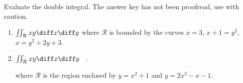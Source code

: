 Evaluate the double integral. The answer key has not been proofread, use with caution.

\begin{enumerate}
\item \label{problemintegralxydxdyoverx=3,x+1=y^2,x=y^2+2y+3} $\iint_{\mathcal R} xy \diff x\diff y$ where $\mathcal R$ is bounded by the curves $x=3 $, $x+1=y^2$, $x= y^2+2y+3$.

\item \label{problemintegralxydxdyovery=x^2+1,y=2x^2-x-1} 
$\iint_{\mathcal R} xy\diff x\diff y\quad .$

where $\mathcal R$ is the region enclosed by $y=x^2+1$ and $y=2x^2-x-1$.  

\end{enumerate}


